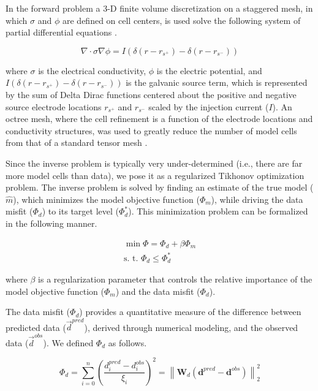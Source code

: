 \documentclass[preprint,authoryear,12pt]{elsarticle}
\begin{document}
In the forward problem a 3-D finite volume discretization on a staggered mesh, in which $\sigma$ and $\phi$ are defined on cell centers, is used solve the following system of partial differential equations \citep{Haber2000, Pidlisecky2007, Cockett2015, Cockett2016}.

\begin{equation}
   \nabla\cdot\sigma\nabla \phi = I(\delta(r - r_{s^{+}}) - \delta(r - r_{s^{-}}))
  \label{eq:DC_Eq}
\end{equation}

\noindent where $\sigma$ is the electrical conductivity, $\phi$ is the electric potential, and $I(\delta(r - r_{s^{+}}) - \delta(r - r_{s^{-}}))$ is the galvanic source term, which is represented by the sum of Delta Dirac functions centered about the positive and negative source electrode locations $r_{s^{+}}$ and $r_{s^{-}}$ scaled by the injection current ($I$). An octree mesh, where the cell refinement is a function of the electrode locations and conductivity structures, was used to greatly reduce the number of model cells from that of a standard tensor mesh \citep{Haber2007,Haber2012}.

Since the inverse problem is typically very under-determined (i.e., there are far more model cells than data), we pose it as a regularized Tikhonov optimization problem. The inverse problem is solved by finding an estimate of the true model ($\widehat{m}$), which minimizes the model objective function ($\Phi_m$), while driving the data misfit ($\Phi_d$) to its target level ($\Phi_{d}^*$).  This minimization problem can be formalized in the following manner.

\begin{eqnarray}
  \label{eq:globphi}
  \min \Phi = \Phi_d+\beta\Phi_m \\
  \mbox{s. t. } \Phi_{d} \leq \Phi_{d}^* \nonumber
\end{eqnarray}

\noindent where $\beta$ is a regularization parameter that controls the relative importance of the model objective function ($\Phi_{m}$) and the data misfit ($\Phi_{d}$).

The data misfit ($\Phi_{d}$) provides a quantitative measure of the difference between predicted data ($\vec{d}^{pred}$), derived through numerical modeling, and the observed data ($\vec{d}^{obs}$). We defined $\Phi_{d}$ as follows.

\begin{equation}
  \Phi_d = \sum^{n}_{i=0}\left(\frac{d^{pred}_i - d^{obs}_i}{\xi_i}\right)^2 = \left\|\mathbf{W}_{d}\left(\mathbf{d}^{pred} - \mathbf{d}^{obs}\right)\right\|_2^2
  \label{eq:Phi_d}
\end{equation}
\end{document}

